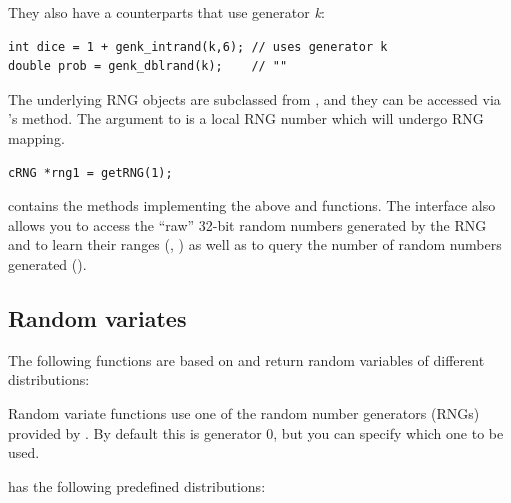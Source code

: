 They also have a counterparts that use generator \textit{k}:

\begin{verbatim}
int dice = 1 + genk_intrand(k,6); // uses generator k
double prob = genk_dblrand(k);    // ""
\end{verbatim}

The underlying RNG objects are subclassed from ,
and they can be accessed via 's  method.
The argument to  is a local RNG number which will undergo
RNG mapping.

\begin{verbatim}
cRNG *rng1 = getRNG(1);
\end{verbatim}

 contains the methods implementing the above 
and  functions. The  interface also allows
you to access the ``raw'' 32-bit random numbers generated by the RNG
and to learn their ranges (, ) as well as
to query the number of random numbers generated ().


\subsection{Random variates}

The following functions are based on  and return
random variables of different distributions:

Random variate functions use one of the random number generators (RNGs)
provided by \opp. By default this is generator 0, but you can specify
which one to be used.

{\opp} has the following predefined distributions:

